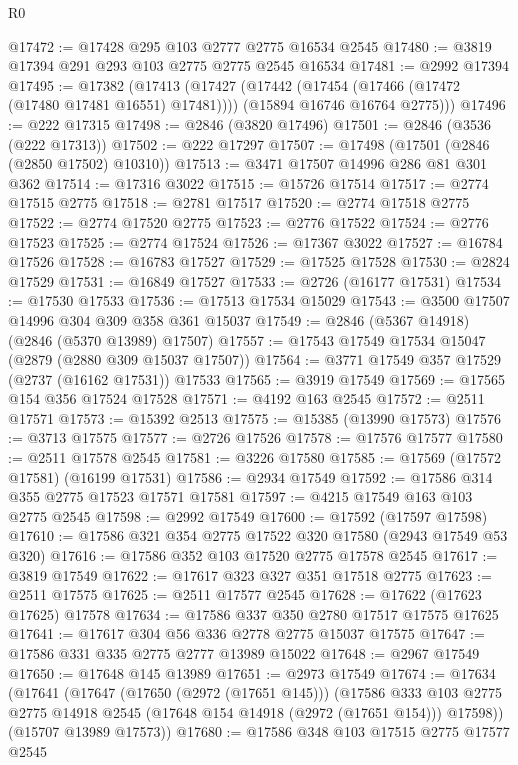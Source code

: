 \begin{lexlean}{R0}
\begin{coremodule}
@17472 := @17428 @295 @103 @2777 @2775 @16534 @2545
@17480 := @3819 @17394 @291 @293 @103 @2775 @2775 @2545 @16534
@17481 := @2992 @17394
@17495 := @17382
    (@17413
      (@17427
        (@17442 (@17454 (@17466 (@17472 (@17480 @17481 @16551) @17481))))
        (@15894 @16746 @16764 @2775)))
@17496 := @222 @17315
@17498 := @2846 (@3820 @17496)
@17501 := @2846 (@3536 (@222 @17313))
@17502 := @222 @17297
@17507 := @17498 (@17501 (@2846 (@2850 @17502) @10310))
@17513 := @3471 @17507 @14996 @286 @81 @301 @362
@17514 := @17316 @3022
@17515 := @15726 @17514
@17517 := @2774 @17515 @2775
@17518 := @2781 @17517
@17520 := @2774 @17518 @2775
@17522 := @2774 @17520 @2775
@17523 := @2776 @17522
@17524 := @2776 @17523
@17525 := @2774 @17524
@17526 := @17367 @3022
@17527 := @16784 @17526
@17528 := @16783 @17527
@17529 := @17525 @17528
@17530 := @2824 @17529
@17531 := @16849 @17527
@17533 := @2726 (@16177 @17531)
@17534 := @17530 @17533
@17536 := @17513 @17534 @15029
@17543 := @3500 @17507 @14996 @304 @309 @358 @361 @15037
@17549 := @2846 (@5367 @14918) (@2846 (@5370 @13989) @17507)
@17557 := @17543 @17549 @17534 @15047 (@2879 (@2880 @309 @15037 @17507))
@17564 := @3771 @17549 @357 @17529 (@2737 (@16162 @17531)) @17533
@17565 := @3919 @17549
@17569 := @17565 @154 @356 @17524 @17528
@17571 := @4192 @163 @2545
@17572 := @2511 @17571
@17573 := @15392 @2513
@17575 := @15385 (@13990 @17573)
@17576 := @3713 @17575
@17577 := @2726 @17526
@17578 := @17576 @17577
@17580 := @2511 @17578 @2545
@17581 := @3226 @17580
@17585 := @17569 (@17572 @17581) (@16199 @17531)
@17586 := @2934 @17549
@17592 := @17586 @314 @355 @2775 @17523 @17571 @17581
@17597 := @4215 @17549 @163 @103 @2775 @2545
@17598 := @2992 @17549
@17600 := @17592 (@17597 @17598)
@17610 := @17586 @321 @354 @2775 @17522 @320 @17580 (@2943 @17549 @53 @320)
@17616 := @17586 @352 @103 @17520 @2775 @17578 @2545
@17617 := @3819 @17549
@17622 := @17617 @323 @327 @351 @17518 @2775
@17623 := @2511 @17575
@17625 := @2511 @17577 @2545
@17628 := @17622 (@17623 @17625) @17578
@17634 := @17586 @337 @350 @2780 @17517 @17575 @17625
@17641 := @17617 @304 @56 @336 @2778 @2775 @15037 @17575
@17647 := @17586 @331 @335 @2775 @2777 @13989 @15022
@17648 := @2967 @17549
@17650 := @17648 @145 @13989
@17651 := @2973 @17549
@17674 := @17634
    (@17641
      (@17647
        (@17650 (@2972 (@17651 @145)))
        (@17586
          @333
          @103
          @2775
          @2775
          @14918
          @2545
          (@17648 @154 @14918 (@2972 (@17651 @154)))
          @17598))
      (@15707 @13989 @17573))
@17680 := @17586 @348 @103 @17515 @2775 @17577 @2545

\end{coremodule}
\end{lexlean}
